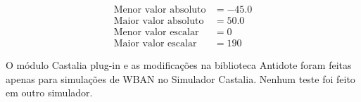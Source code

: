 \begin{align*}
    \text{Menor valor absoluto} &= -45.0 \\
    \text{Maior valor absoluto} &= 50.0 \\
    \text{Menor valor escalar} &= 0 \\
    \text{Maior valor escalar} &= 190
\end{align*}


O módulo Castalia plug-in e as modificações na biblioteca Antidote foram feitas apenas para simulações de WBAN no Simulador Castalia. Nenhum teste foi feito em outro simulador.

